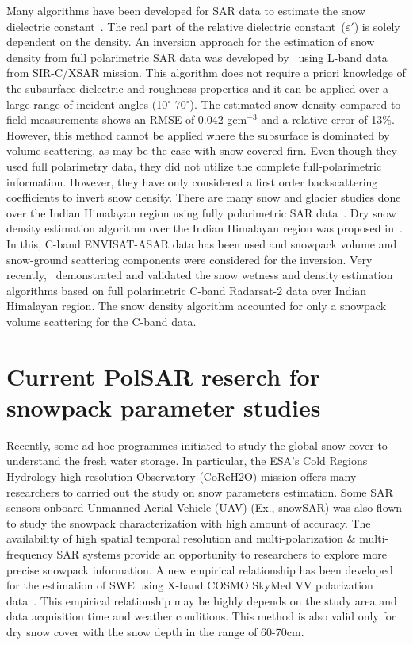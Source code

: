 \begin{description}
	Many algorithms have been developed for SAR data to estimate the snow dielectric constant~\citep{Shi93,Shi95,Singh2007_spie,niang2007new,singh2010snow,surendar2013improved,bhattacharya2014snow}. The real part of the relative dielectric constant~($\varepsilon{'}$) is solely dependent on the density. An inversion approach for the estimation of snow density from full polarimetric SAR data was developed by~\citep{Shi2000} using L-band data from SIR-C/XSAR mission. This algorithm does not require a priori knowledge of the subsurface dielectric and roughness properties and it can be applied over a large range of incident angles (10$^\circ$-70$^\circ$). The estimated snow density compared to field measurements shows an RMSE of 0.042 gcm$^{-3}$ and a relative error of 13$\%$. However, this method cannot be applied where the subsurface is dominated by volume scattering, as may be the case with snow-covered firn. Even though they used full polarimetry data, they did not utilize the complete full-polarimetric information. However, they have only considered a first order backscattering coefficients to invert snow density. There are many snow and glacier studies done over the Indian Himalayan region using fully polarimetric SAR  data~\citep{singh2011a,singh2012a,singh2012b,singh2014a,singh2014b}. Dry snow density estimation algorithm over the Indian Himalayan region was proposed in~\citep{Snehmani2010density}. In this, C-band ENVISAT-ASAR data has been used and snowpack volume and snow-ground scattering components were considered for the inversion. Very recently,~\citep{surendar2015density} demonstrated and validated the snow wetness and density estimation algorithms based on full polarimetric C-band Radarsat-2 data over Indian Himalayan region. The snow density algorithm accounted for only a snowpack volume scattering for the C-band data. 
	 
\end{description}
	
\section{Current PolSAR reserch for snowpack parameter studies}
	Recently, some ad-hoc programmes initiated to study the global snow cover to understand the fresh water storage. In particular, the ESA’s Cold Regions Hydrology high-resolution Observatory (CoReH2O) mission offers many researchers to carried out the study on snow parameters estimation. Some SAR sensors onboard Unmanned Aerial Vehicle (UAV) (Ex., snowSAR) was also flown to study the snowpack characterization with high amount of accuracy. The availability of high spatial temporal resolution and multi-polarization $\&$ multi-frequency SAR systems provide an opportunity to researchers to explore more precise snowpack information. A new empirical relationship has been developed for the estimation of SWE using X-band COSMO SkyMed $\mbox{VV}$ polarization data~\citep{Pettinato2013}. This empirical relationship may be highly depends on the study area and data acquisition time and weather conditions. This method is also valid only for dry snow cover with the snow depth in the range of 60-70cm. 
	
